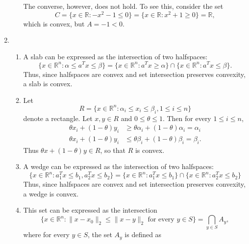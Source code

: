 \documentclass[letterpaper,12pt]{article}
\begin{document}
\begin{enumerate}
\begin{enumerate}
  \bigskip

  The converse, however, does not hold. To see this, consider the set
  \begin{equation*}
    C = \{x \in \mathbb{R} : -x^2 - 1 \leq 0\}
      = \{x \in \mathbb{R} : x^2 + 1 \geq 0\}
      = \mathbb{R},
  \end{equation*}
  which is convex, but $A = -1 < 0$.
\end{enumerate}

\item
\begin{enumerate}
\item A slab can be expressed as the intersection of two halfspaces:
  \begin{equation*}
    \{x \in \mathbb{R}^n : \alpha \leq a^T x \leq \beta\}
      = \{x \in \mathbb{R}^n : a^T x \geq \alpha\}
          \cap \{x \in \mathbb{R}^n : a^T x \leq \beta\}.
  \end{equation*}
  Thus, since halfspaces are convex and set intersection preserves
  convexity, a slab is convex.

\item Let
  \begin{equation*}
    R = \{x \in \mathbb{R}^n
      : \alpha_i \leq x_i \leq \beta_i, 1 \leq i \leq n\}
  \end{equation*}
  denote a rectangle. Let $x, y \in R$ and $0 \leq \theta \leq
  1$. Then for every $1 \leq i \leq n$,
  \begin{align*}
    \theta x_i + (1 - \theta) y_i
      &\geq \theta \alpha_i + (1 - \theta) \alpha_i
      = \alpha_i \\
    \theta x_i + (1 - \theta) y_i
      &\leq \theta \beta_i + (1 - \theta) \beta_i
      = \beta_i.
  \end{align*}
  Thus $\theta x + (1 - \theta) y \in R$, so that $R$ is convex.

\item A wedge can be expressed as the intersection of two halfspaces:
  \begin{equation*}
    \{x \in \mathbb{R}^n : a_1^T x \leq b_1, a_2^T x \leq b_2\}
      = \{x \in \mathbb{R}^n : a_1^T x \leq b_1\}
          \cap \{x \in \mathbb{R}^n : a_2^T x \leq b_2\}
  \end{equation*}
  Thus, since halfspaces are convex and set intersection preserves
  convexity, a wedge is convex.

\item This set can be expressed as the intersection
  \begin{equation*}
    \{x \in \mathbb{R}^n : \lVert x - x_0 \rVert_2 \leq \lVert x - y \rVert_2
      \text{ for every $y \in S$}\}
    = \bigcap_{y \in S} A_y,
  \end{equation*}
  where for every $y \in S$, the set $A_y$ is defined as
  \begin{equation*}
  \end{equation*}

\end{enumerate}

\end{enumerate}
\end{document}
